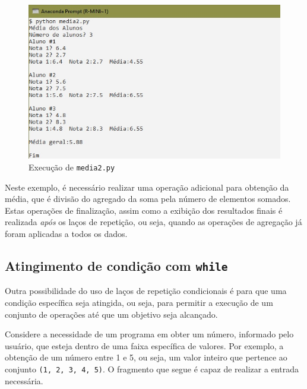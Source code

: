 \documentclass[
]{book}
\begin{document}
\begin{figure}
\centering
\includegraphics{images/05-04.jpg}
\caption{\label{fig:05-04}Execução de \texttt{media2.py}}
\end{figure}

Neste exemplo, é necessário realizar uma operação adicional para obtenção da média, que é divisão do agregado da soma pela número de elementos somados. Estas operações de finalização, assim como a exibição dos resultados finais é realizada \emph{após} os laços de repetição, ou seja, quando as operações de agregação já foram aplicadas a todos os dados.

\hypertarget{repet-while-ating}{%
\subsection{\texorpdfstring{Atingimento de condição com \texttt{while}}{Atingimento de condição com while}}\label{repet-while-ating}}

Outra possibilidade do uso de laços de repetição condicionais é para que uma condição específica seja atingida, ou seja, para permitir a execução de um conjunto de operações até que um objetivo seja alcançado.

Considere a necessidade de um programa em obter um número, informado pelo usuário, que esteja dentro de uma faixa específica de valores. Por exemplo, a obtenção de um número entre 1 e 5, ou seja, um valor inteiro que pertence ao conjunto \texttt{(1,\ 2,\ 3,\ 4,\ 5)}. O fragmento que segue é capaz de realizar a entrada necessária.
\end{document}
